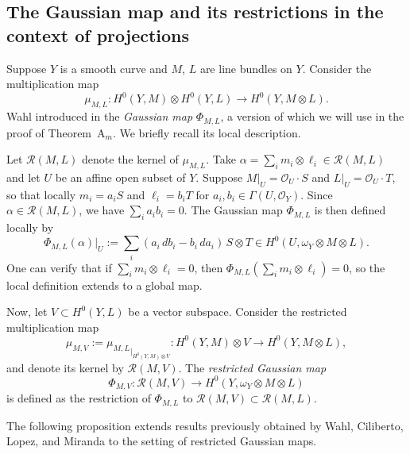 \documentclass[a4paper,12pt]{amsart}
\begin{document}
\medskip

\subsection{The Gaussian map and its restrictions in the context of projections}\label{Sec33}

Suppose $Y$ is a smooth curve and $M$, $L$ are line bundles on $Y$. Consider the multiplication map
\[
 \mu_{M,L} : H^0(Y, M) \otimes H^0(Y, L) \to H^0(Y, M \otimes L).
\]
Wahl introduced in \cite{Wahl90} the \emph{Gaussian map} $\Phi_{M,L}$, a version of which we will use in the proof of \textnormal{Theorem~A$_m$}. We briefly recall its local description.

Let $\mathscr{R}(M,L)$ denote the kernel of $\mu_{M,L}$. Take $\alpha = \sum_i m_i \otimes \ell_i \in \mathscr{R}(M,L)$ and let $U$ be an affine open subset of $Y$. Suppose $M|_U = \mathcal{O}_U \cdot S$ and $L|_U = \mathcal{O}_U \cdot T$, so that locally $m_i = a_i S$ and $\ell_i = b_i T$ for $a_i, b_i \in \Gamma(U, \mathcal{O}_Y)$. Since $\alpha \in \mathscr{R}(M,L)$, we have $\sum_i a_i b_i = 0$. The Gaussian map $\Phi_{M,L}$ is then defined locally by
\[
 \Phi_{M,L}(\alpha)|_U := \sum_i (a_i\, d b_i - b_i\, d a_i)\, S \otimes T \in H^0(U, \omega_Y \otimes M \otimes L).
\]
One can verify that if $\sum_i m_i \otimes \ell_i = 0$, then $\Phi_{M,L}(\sum_i m_i \otimes \ell_i) = 0$, so the local definition extends to a global map.

Now, let $V \subset H^0(Y, L)$ be a vector subspace. Consider the restricted multiplication map
\[
 \mu_{M,V} := {\mu_{M, L}}_{|_{H^0 (Y,M) \otimes V}} : H^0 (Y, M) \otimes V \to H^0 (Y, M \otimes L) ,
\]
and denote its kernel by $\mathscr{R}(M, V)$. The \emph{restricted Gaussian map}
\[
 \Phi_{M,V} : \mathscr{R}(M,V) \to H^0(Y, \omega_Y \otimes M \otimes L)
\]
is defined as the restriction of $\Phi_{M,L}$ to $\mathscr{R}(M, V) \subset \mathscr{R}(M, L)$.

\medskip


The following proposition extends results previously obtained by Wahl, Ciliberto, Lopez, and Miranda to the setting of restricted Gaussian maps.
\end{document}
